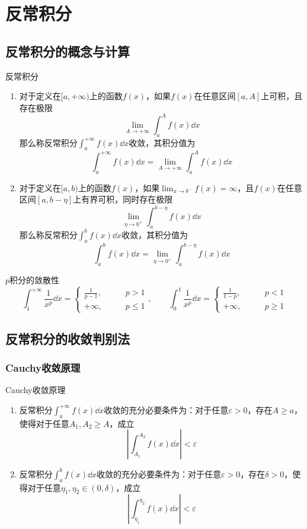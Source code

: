 \documentclass[lang = cn, scheme = chinese, thmcnt = section]{elegantbook}
\begin{document}
\chapter{反常积分}

\section{反常积分的概念与计算}

\begin{definition}{反常积分}
	\begin{enumerate}
		\item 对于定义在$[a,+\infty)$上的函数$f(x)$，如果$f(x)$在任意区间$[a,A]$上可积，且存在极限
		$$
		\lim_{A\to+\infty}\int_a^Af(x)\dd x
		$$
		那么称反常积分$\displaystyle \int_a^{+\infty}f(x)\dd x$收敛，其积分值为
		$$
		\int_a^{+\infty}f(x)\dd x=\lim_{A\to+\infty}\int_a^Af(x)\dd x
		$$
		\item 对于定义在$[a,b)$上的函数$f(x)$，如果$\displaystyle \lim_{x\to b^-}f(x)=\infty$，且$f(x)$在任意区间$[a,b-\eta]$上有界可积，同时存在极限
		$$
		\lim_{\eta\to 0^+}\int_a^{b-\eta}f(x)\dd x
		$$
		那么称反常积分$\displaystyle \int_a^bf(x)\dd x$收敛，其积分值为
		$$
		\int_a^bf(x)\dd x=\lim_{\eta\to 0^+}\int_a^{b-\eta}f(x)\dd x
		$$
	\end{enumerate}
\end{definition}

\begin{theorem}{$p$积分的敛散性}
	$$
	\int_1^{+\infty}\frac{1}{x^p}\dd x
	=\begin{cases}
		\frac{1}{p-1},\qquad & p>1\\
		+\infty,\qquad  & p\le 1
	\end{cases},\qquad 
	\int_0^1\frac{1}{x^p}\dd x
	=\begin{cases}
		\frac{1}{1-p},\qquad & p<1\\
		+\infty,\qquad  & p\ge 1
	\end{cases}
	$$
\end{theorem}

\section{反常积分的收敛判别法}

\subsection{Cauchy收敛原理}

\begin{theorem}{Cauchy收敛原理}
	\begin{enumerate}
		\item 反常积分$\displaystyle \int_a^{+\infty}f(x)\dd x$收敛的充分必要条件为：对于任意$\varepsilon>0$，存在$A\ge a$，使得对于任意$A_1,A_2\ge A$，成立
		$$
		\left| \int_{A_1}^{A_2}f(x)\dd x \right|<\varepsilon
		$$
		\item 反常积分$\displaystyle \int_a^{b}f(x)\dd x$收敛的充分必要条件为：对于任意$\varepsilon>0$，存在$\delta>0$，使得对于任意$\eta_1,\eta_2\in (0,\delta)$，成立
		$$
		\left| \int_{\eta_1}^{\eta_2}f(x)\dd x \right|<\varepsilon
		$$
	\end{enumerate}
\end{theorem}
\end{document}
